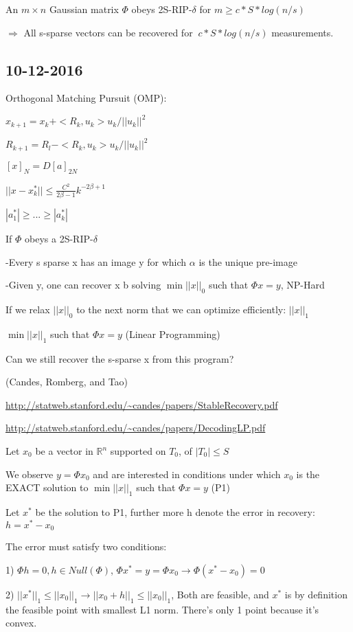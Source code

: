 \documentclass[12pt,letterpaper]{report}
\begin{document}
An $m \times n$ Gaussian matrix $\Phi$ obeys 2S-RIP-$\delta$ for $m \geq c * S * log(n/s)$

$\Rightarrow$ All s-sparse vectors can be recovered for $~c*S*log(n/s)$ measurements.

\subsection*{10-12-2016}

Orthogonal Matching Pursuit (OMP):

$x_{k+1} = x_k + <R_k, u_k> u_k / ||u_k||^2$

$R_{k+1} = R_l - <R_k, u_k> u_k / ||u_k||^2$

$[x]_N = D[a]_{2N}$

$||x - x_k^*|| \leq \frac{C^2}{2\beta -1}k^{-2\beta+1}$

$|a_1^*| \geq ... \geq |a_k^*|$


If $\Phi$ obeys a 2S-RIP-$\delta$

-Every s sparse x has an image y for which $\alpha$ is the unique pre-image

-Given y, one can recover x b solving $\min ||x||_0$ such that $\Phi x = y$, NP-Hard

If we relax $||x||_0$ to the next norm that we can optimize efficiently: $||x||_1$

$\min ||x||_1$ such that $\Phi x = y$ (Linear Programming)

Can we still recover the s-sparse x from this program?

(Candes, Romberg, and Tao)

\url{http://statweb.stanford.edu/~candes/papers/StableRecovery.pdf}

\url{http://statweb.stanford.edu/~candes/papers/DecodingLP.pdf}

Let $x_0$ be a vector in $\mathbb{R}^n$ supported on $T_0$, of $|T_0| \leq S$

We observe $ y = \Phi x_0$ and are interested in conditions under which $x_0$ is the EXACT solution to $\min ||x||_1$ such that $\Phi x = y$ (P1)

Let $x^*$ be the solution to P1, further more h denote the error in recovery: $h = x^* - x_0$

The error must satisfy two conditions:

1) $\Phi h = 0, h \in Null(\Phi)$, $\Phi x^* = y = \Phi x_0 \rightarrow \Phi (x^* - x_0) = 0$

2) $||x^*||_1 \leq ||x_0||_1 \rightarrow ||x_0 + h||_1 \leq ||x_0||_1$, Both are feasible, and $x^*$ is by definition the feasible point with smallest L1 norm.  There's only 1 point because it's convex.
\end{document}
